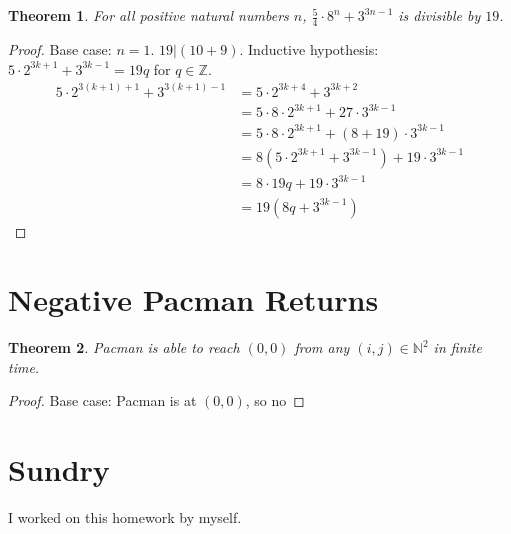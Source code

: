 \documentclass{article}
\newtheorem{theorem}{Theorem}
\newcommand{\N}{\mathbb{N}}
\newcommand{\Z}{\mathbb{Z}}
\begin{document}
\subsection{}

\begin{theorem}
    For all positive natural numbers \(n\), \(\frac{5}{4} \cdot 8^n + 3^{3n - 1}\) is divisible by \(19\).
\end{theorem}
\begin{proof}
    Base case: \(n = 1\). \(19 | (10 + 9)\).
    Inductive hypothesis: \(5 \cdot 2^{3k + 1} + 3^{3k - 1} = 19q\) for \(q \in \Z\).
    \begin{align}
        5 \cdot 2^{3 (k + 1) + 1} + 3^{3 (k + 1) - 1} &= 5 \cdot 2^{3k + 4} + 3^{3k + 2} \\
        &= 5 \cdot 8 \cdot 2^{3k + 1} + 27 \cdot 3^{3k - 1} \\
        &= 5 \cdot 8 \cdot 2^{3k + 1} + (8 + 19) \cdot 3^{3k - 1} \\
        &= 8 (5 \cdot 2^{3k + 1} + 3^{3k - 1}) + 19 \cdot 3^{3k - 1} \\
        &= 8 \cdot 19q + 19 \cdot 3^{3k - 1} \\
        &= 19 (8q + 3^{3k - 1})
    \end{align}
\end{proof}

\section{Negative Pacman Returns}

\begin{theorem}
    Pacman is able to reach \((0, 0)\) from any \((i, j) \in \N^2\) in finite time.
\end{theorem}

\begin{proof}
    Base case: Pacman is at \((0, 0)\), so no 
\end{proof}

\section{Sundry}

I worked on this homework by myself.
\end{document}
